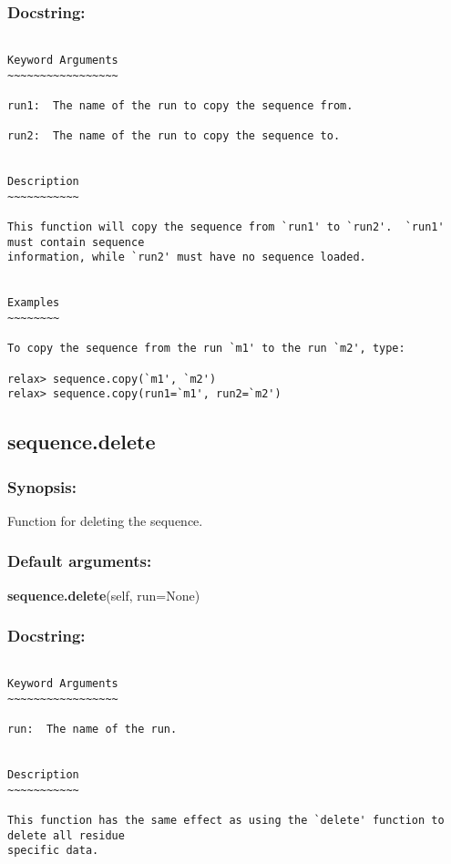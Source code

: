 \subsubsection{Docstring:}

{\scriptsize
\begin{verbatim}

Keyword Arguments
~~~~~~~~~~~~~~~~~

run1:  The name of the run to copy the sequence from.

run2:  The name of the run to copy the sequence to.


Description
~~~~~~~~~~~

This function will copy the sequence from `run1' to `run2'.  `run1' must contain sequence
information, while `run2' must have no sequence loaded.


Examples
~~~~~~~~

To copy the sequence from the run `m1' to the run `m2', type:

relax> sequence.copy(`m1', `m2')
relax> sequence.copy(run1=`m1', run2=`m2')
\end{verbatim}
}



\newpage

\subsection{sequence.delete}


\subsubsection{Synopsis:}

Function for deleting the sequence.

\subsubsection{Default arguments:}

\textsf{\textbf{sequence.delete}(self, run=None)
}


\subsubsection{Docstring:}

{\scriptsize
\begin{verbatim}

Keyword Arguments
~~~~~~~~~~~~~~~~~

run:  The name of the run.


Description
~~~~~~~~~~~

This function has the same effect as using the `delete' function to delete all residue
specific data.
\end{verbatim}
}



